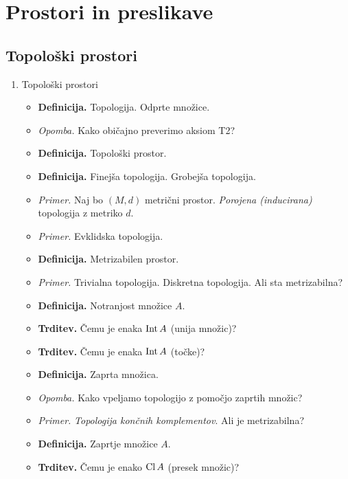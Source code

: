 \section{Prostori in preslikave}

\subsection{Topološki prostori}
\begin{enumerate}
    \item Topološki prostori
    \begin{itemize}
        \item \colorbox{purple!30}{\textbf{Definicija.}} Topologija. Odprte množice.
        \item \colorbox{yellow!30}{\emph{Opomba.}} Kako običajno preverimo aksiom T2?
        \item \colorbox{purple!30}{\textbf{Definicija.}} Topološki prostor.
        \item \colorbox{purple!30}{\textbf{Definicija.}} Finejša topologija. Grobejša topologija.         
        \item \colorbox{yellow!30}{\emph{Primer.}} Naj bo $(M, d)$ metrični prostor. \emph{Porojena (inducirana)} topologija z metriko $d$.
        \item \colorbox{yellow!30}{\emph{Primer.}} Evklidska topologija.
        \item \colorbox{purple!30}{\textbf{Definicija.}} Metrizabilen prostor.
        \item \colorbox{yellow!30}{\emph{Primer.}} Trivialna topologija. Diskretna topologija. Ali sta metrizabilna?
        \item \colorbox{purple!30}{\textbf{Definicija.}} Notranjost množice $A$.
        \item \colorbox{blue!30}{\textbf{Trditev.}} Čemu je enaka $\operatorname{Int} A$ (unija množic)?
        \item \colorbox{blue!30}{\textbf{Trditev.}} Čemu je enaka $\operatorname{Int} A$ (točke)?
        \item \colorbox{purple!30}{\textbf{Definicija.}} Zaprta množica.
        \item \colorbox{yellow!30}{\emph{Opomba.}} Kako vpeljamo topologijo z pomočjo zaprtih množic?
        \item \colorbox{yellow!30}{\emph{Primer.}} \emph{Topologija končnih komplementov}. Ali je metrizabilna?
        \item \colorbox{purple!30}{\textbf{Definicija.}} Zaprtje množice $A$.
        \item \colorbox{blue!30}{\textbf{Trditev.}} Čemu je enako $\operatorname{Cl} A$ (presek množic)?

\end{itemize}
\end{enumerate}
